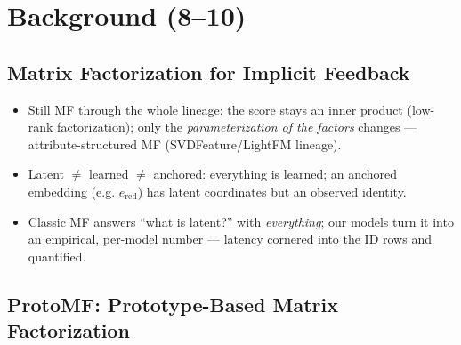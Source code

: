 \cleardoublepage
\chapter{Background (8--10)}   %
\label{ch:background}

\section{Matrix Factorization for Implicit Feedback}
\label{sec:bg-mf}
\begin{itemize}
    \item Still MF through the whole lineage: the score stays an inner product (low-rank factorization); only the \emph{parameterization of the factors} changes — attribute-structured MF (SVDFeature/LightFM lineage).
    \item Latent $\neq$ learned $\neq$ anchored: everything is learned; an anchored embedding (e.g. $e_{\text{red}}$) has latent coordinates but an observed identity.
    \item Classic MF answers ``what is latent?'' with \emph{everything}; our models turn it into an empirical, per-model number — latency cornered into the ID rows and quantified.
\end{itemize}

\section{ProtoMF: Prototype-Based Matrix Factorization}
\label{sec:bg-protomf}

